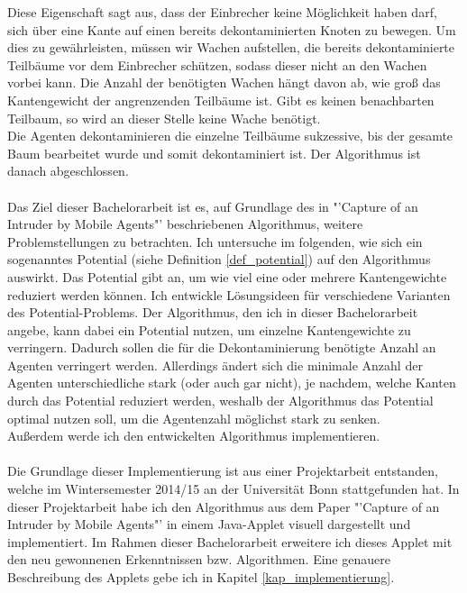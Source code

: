 Diese Eigenschaft sagt aus, dass der Einbrecher keine Möglichkeit haben darf, sich über eine Kante auf einen bereits dekontaminierten Knoten zu bewegen. Um dies zu gewährleisten, müssen wir Wachen aufstellen, die bereits dekontaminierte Teilbäume vor dem Einbrecher schützen, sodass dieser nicht an den Wachen vorbei kann. Die Anzahl der benötigten Wachen hängt davon ab, wie groß das Kantengewicht der angrenzenden Teilbäume ist. Gibt es keinen benachbarten Teilbaum, so wird an dieser Stelle keine Wache benötigt.\\
Die Agenten dekontaminieren die einzelne Teilbäume sukzessive, bis der gesamte Baum bearbeitet wurde und somit dekontaminiert ist. Der Algorithmus ist danach abgeschlossen.
\\
\\
Das Ziel dieser Bachelorarbeit ist es, auf Grundlage des in "'Capture of an Intruder by Mobile Agents"' \cite{cima_paper} beschriebenen Algorithmus, weitere Problemstellungen zu betrachten. Ich untersuche im folgenden, wie sich ein sogenanntes Potential (siehe Definition \ref{def_potential}) auf den Algorithmus auswirkt. Das Potential gibt an, um wie viel eine oder mehrere Kantengewichte reduziert werden können. Ich entwickle Lösungsideen für verschiedene Varianten des Potential-Problems. Der Algorithmus, den ich in dieser Bachelorarbeit angebe, kann dabei ein Potential nutzen, um einzelne Kantengewichte zu verringern. Dadurch sollen die für die Dekontaminierung benötigte Anzahl an Agenten verringert werden. Allerdings ändert sich die minimale Anzahl der Agenten unterschiedliche stark (oder auch gar nicht), je nachdem, welche Kanten durch das Potential reduziert werden, weshalb der Algorithmus das Potential optimal nutzen soll, um die Agentenzahl möglichst stark zu senken.\\
Außerdem werde ich den entwickelten Algorithmus implementieren.
\\
\\
Die Grundlage dieser Implementierung ist aus einer Projektarbeit entstanden, welche im Wintersemester 2014/15 an der Universität Bonn stattgefunden hat.
In dieser Projektarbeit habe ich den Algorithmus aus dem Paper "'Capture of an Intruder by Mobile Agents"' \cite{cima_paper} in einem Java-Applet visuell dargestellt und implementiert. Im Rahmen dieser Bachelorarbeit erweitere ich dieses Applet mit den neu gewonnenen Erkenntnissen bzw. Algorithmen. Eine genauere Beschreibung des Applets gebe ich in Kapitel \ref{kap_implementierung}.



